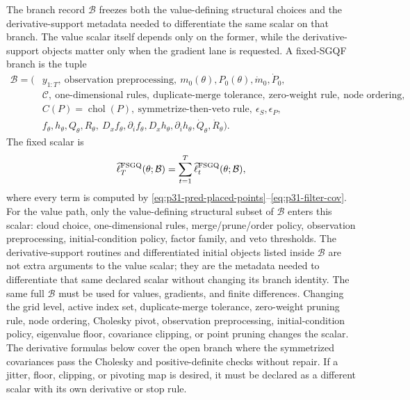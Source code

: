 \documentclass[11pt]{article}
\numberwithin{equation}{section}
\newcommand{\chol}{\operatorname{chol}}
\newcommand{\ellhat}{\widehat\ell}
\begin{document}
The branch record \(\mathcal B\) freezes both the value-defining structural
choices and the derivative-support metadata needed to differentiate the same
scalar on that branch.  The value scalar itself depends only on the former, while
the derivative-support objects matter only when the gradient lane is requested.
A fixed-SGQF branch is the tuple
\begin{equation}
\begin{aligned}
  \mathcal B
  =
  (&y_{1:T},\ \text{observation preprocessing},\
  m_0(\theta),P_0(\theta),\dot m_0,\dot P_0,\\
  &\mathcal C,\ \text{one-dimensional rules},\
  \text{duplicate-merge tolerance},\
  \text{zero-weight rule},\
  \text{node ordering},\\
  &C(P)=\chol(P),\
  \text{symmetrize-then-veto rule},\
  \epsilon_S,\epsilon_P,\\
  &f_\theta,h_\theta,Q_\theta,R_\theta,\
  D_xf_\theta,\partial_i f_\theta,
  D_xh_\theta,\partial_i h_\theta,\dot Q_\theta,\dot R_\theta).
\end{aligned}
  \label{eq:p31-branch-tuple}
\end{equation}
The fixed scalar is
\begin{equation}
  \ellhat_T^{\rm FSGQ}(\theta;\mathcal B)
  =
  \sum_{t=1}^T \ellhat_t^{\rm FSGQ}(\theta;\mathcal B),
  \label{eq:p31-fixed-scalar}
\end{equation}
where every term is computed by
\eqref{eq:p31-pred-placed-points}--\eqref{eq:p31-filter-cov}.  For the value
path, only the value-defining structural subset of \(\mathcal B\) enters this
scalar: cloud choice, one-dimensional rules, merge/prune/order policy,
observation preprocessing, initial-condition policy, factor family, and veto
thresholds.  The derivative-support routines and differentiated initial objects
listed inside \(\mathcal B\) are not extra arguments to the value scalar; they are
the metadata needed to differentiate that same declared scalar without changing
its branch identity.  The same full \(\mathcal B\) must be used for values,
gradients, and finite differences.
Changing the grid level, active index set, duplicate-merge tolerance,
zero-weight pruning rule, node ordering, Cholesky pivot, observation
preprocessing, initial-condition policy, eigenvalue floor, covariance clipping,
or point pruning changes the scalar.  The
derivative formulas below cover the open branch where the symmetrized
covariances pass the Cholesky and positive-definite checks without repair.  If
a jitter, floor, clipping, or pivoting map is desired, it must be declared as a
different scalar with its own derivative or stop rule.
\end{document}
